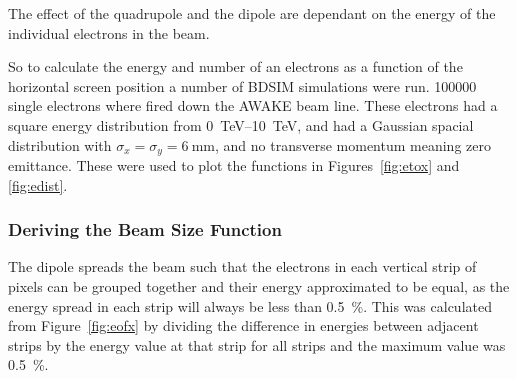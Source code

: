 The effect of the quadrupole and the dipole are dependant on the energy of the
individual electrons in the beam.




So to calculate the energy and number of an electrons as a function of the
horizontal screen position a number of BDSIM simulations were run. \num{100 000}
single electrons where fired down the AWAKE beam line.  These electrons had a
square energy distribution from \SIrange{0}{10}{\tera\electronvolt}, and had a
Gaussian spacial distribution with \(\sigma_x = \sigma_y =
\SI{6}{\milli\meter}\), and no transverse momentum meaning zero emittance. These
were used to plot the functions in Figures~\ref{fig:etox} and \ref{fig:edist}.


\subsubsection{Deriving the Beam Size Function}

The dipole spreads the beam such that the
electrons in each vertical strip of pixels can be grouped together and their
energy approximated to be equal, as the energy spread in each strip will always
be less than \SI{0.5}{\percent}. This was calculated from Figure~\ref{fig:eofx}
by dividing the difference in energies between adjacent strips by the energy
value at that strip for all strips and the maximum value was \SI{0.5}{\percent}.



